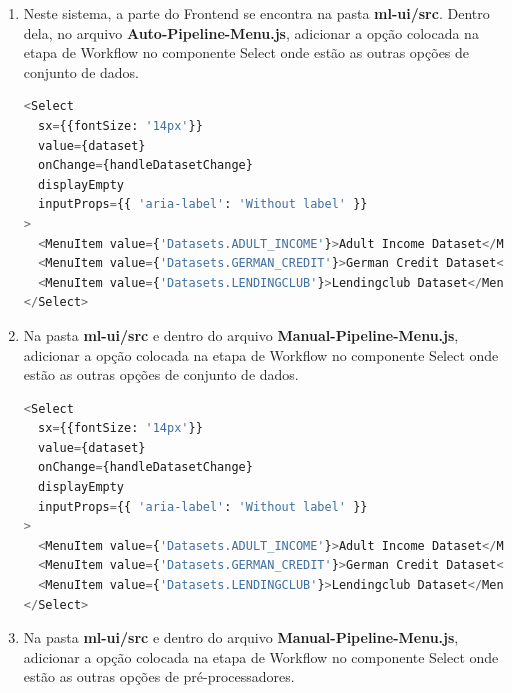 \documentclass[Portugues,Final]{ic-tese-v3}
\begin{document}
\begin{enumerate}
\item Neste sistema, a parte do Frontend se encontra na pasta \textbf{ml-ui/src}. Dentro dela, no arquivo \textbf{Auto-Pipeline-Menu.js}, adicionar a opção colocada na etapa de Workflow no componente Select onde estão as outras opções de conjunto de dados.

\begin{lstlisting}[language=Python, label=cod:AddDatasetAuto]
<Select
  sx={{fontSize: '14px'}}
  value={dataset}
  onChange={handleDatasetChange}
  displayEmpty
  inputProps={{ 'aria-label': 'Without label' }}
>
  <MenuItem value={'Datasets.ADULT_INCOME'}>Adult Income Dataset</MenuItem>
  <MenuItem value={'Datasets.GERMAN_CREDIT'}>German Credit Dataset</MenuItem>
  <MenuItem value={'Datasets.LENDINGCLUB'}>Lendingclub Dataset</MenuItem>
</Select>
\end{lstlisting}

\item Na pasta \textbf{ml-ui/src} e dentro do arquivo \textbf{Manual-Pipeline-Menu.js}, adicionar a opção colocada na etapa de Workflow no componente Select onde estão as outras opções de conjunto de dados.

\begin{lstlisting}[language=Python, label=cod:AddDatasetManual]
<Select
  sx={{fontSize: '14px'}}
  value={dataset}
  onChange={handleDatasetChange}
  displayEmpty
  inputProps={{ 'aria-label': 'Without label' }}
>
  <MenuItem value={'Datasets.ADULT_INCOME'}>Adult Income Dataset</MenuItem>
  <MenuItem value={'Datasets.GERMAN_CREDIT'}>German Credit Dataset</MenuItem>
  <MenuItem value={'Datasets.LENDINGCLUB'}>Lendingclub Dataset</MenuItem>
</Select>
\end{lstlisting}

\item Na pasta \textbf{ml-ui/src} e dentro do arquivo \textbf{Manual-Pipeline-Menu.js}, adicionar a opção colocada na etapa de Workflow no componente Select onde estão as outras opções de pré-processadores.


\end{enumerate}
\end{document}

